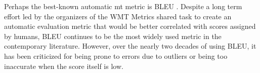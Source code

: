 Perhaps the best-known automatic \gls{mt} metric is BLEU
\citep{papineni2002bleu}.  Despite a long term effort led by the organizers of
the WMT Metrics shared task to create an automatic evaluation metric that would
be better correlated with scores assigned by humans, BLEU continues to be the
most widely used metric in the contemporary literature. However, over the nearly
two decades of using BLEU, it has been criticized for being prone to errors due
to outliers or being too inaccurate when the score itself is low.
\citep{callison-burch-etal-2006-evaluating,bojar-etal-2010-tackling,reiter2018structured,mathur-etal-2020-tangled}





